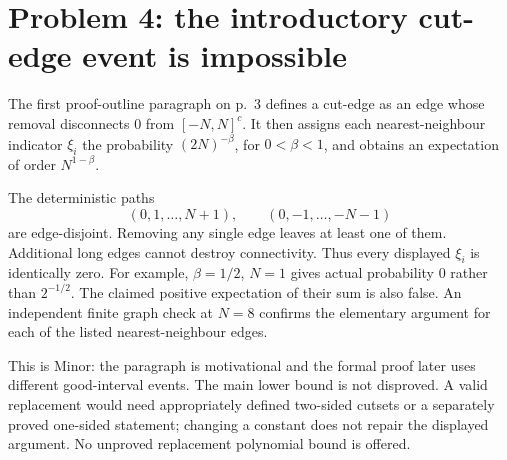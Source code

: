 \documentclass[10pt]{article}
\begin{document}
\section*{Problem 4: the introductory cut-edge event is impossible}
The first proof-outline paragraph on p. 3 defines a cut-edge as an edge whose removal disconnects 0 from \([-N,N]^c\). It then assigns each nearest-neighbour indicator \(\xi_i\) the probability \((2N)^{-\beta}\), for \(0<\beta<1\), and obtains an expectation of order \(N^{1-\beta}\).\par
The deterministic paths \[(0,1,\ldots,N+1),\qquad (0,-1,\ldots,-N-1)\] are edge-disjoint. Removing any single edge leaves at least one of them. Additional long edges cannot destroy connectivity. Thus every displayed \(\xi_i\) is identically zero. For example, \(\beta=1/2\), \(N=1\) gives actual probability 0 rather than \(2^{-1/2}\). The claimed positive expectation of their sum is also false. An independent finite graph check at \(N=8\) confirms the elementary argument for each of the listed nearest-neighbour edges.\par
This is Minor: the paragraph is motivational and the formal proof later uses different good-interval events. The main lower bound is not disproved. A valid replacement would need appropriately defined two-sided cutsets or a separately proved one-sided statement; changing a constant does not repair the displayed argument. No unproved replacement polynomial bound is offered.\par
\end{document}

